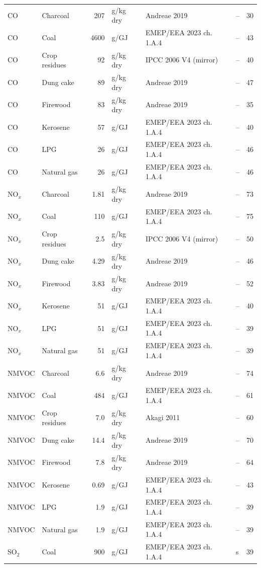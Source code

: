 \begin{table}[htbp]
\begin{tabular}{@{}llrlllr@{}}
CO & Charcoal & 207 & g/kg dry & Andreae 2019 & -- & 30 \\
CO & Coal & 4600 & g/GJ & EMEP/EEA 2023 ch.\,1.A.4 & -- & 43 \\
CO & Crop residues & 92 & g/kg dry & IPCC 2006 V4 (mirror) & -- & 40 \\
CO & Dung cake & 89 & g/kg dry & Andreae 2019 & -- & 47 \\
CO & Firewood & 83 & g/kg dry & Andreae 2019 & -- & 35 \\
CO & Kerosene & 57 & g/GJ & EMEP/EEA 2023 ch.\,1.A.4 & -- & 40 \\
CO & LPG & 26 & g/GJ & EMEP/EEA 2023 ch.\,1.A.4 & -- & 46 \\
CO & Natural gas & 26 & g/GJ & EMEP/EEA 2023 ch.\,1.A.4 & -- & 46 \\
NO$_x$ & Charcoal & 1.81 & g/kg dry & Andreae 2019 & -- & 73 \\
NO$_x$ & Coal & 110 & g/GJ & EMEP/EEA 2023 ch.\,1.A.4 & -- & 75 \\
NO$_x$ & Crop residues & 2.5 & g/kg dry & IPCC 2006 V4 (mirror) & -- & 50 \\
NO$_x$ & Dung cake & 4.29 & g/kg dry & Andreae 2019 & -- & 46 \\
NO$_x$ & Firewood & 3.83 & g/kg dry & Andreae 2019 & -- & 52 \\
NO$_x$ & Kerosene & 51 & g/GJ & EMEP/EEA 2023 ch.\,1.A.4 & -- & 40 \\
NO$_x$ & LPG & 51 & g/GJ & EMEP/EEA 2023 ch.\,1.A.4 & -- & 39 \\
NO$_x$ & Natural gas & 51 & g/GJ & EMEP/EEA 2023 ch.\,1.A.4 & -- & 39 \\
NMVOC & Charcoal & 6.6 & g/kg dry & Andreae 2019 & -- & 74 \\
NMVOC & Coal & 484 & g/GJ & EMEP/EEA 2023 ch.\,1.A.4 & -- & 61 \\
NMVOC & Crop residues & 7.0 & g/kg dry & Akagi 2011 & -- & 60 \\
NMVOC & Dung cake & 14.4 & g/kg dry & Andreae 2019 & -- & 70 \\
NMVOC & Firewood & 7.8 & g/kg dry & Andreae 2019 & -- & 64 \\
NMVOC & Kerosene & 0.69 & g/GJ & EMEP/EEA 2023 ch.\,1.A.4 & -- & 43 \\
NMVOC & LPG & 1.9 & g/GJ & EMEP/EEA 2023 ch.\,1.A.4 & -- & 39 \\
NMVOC & Natural gas & 1.9 & g/GJ & EMEP/EEA 2023 ch.\,1.A.4 & -- & 39 \\
SO$_2$ & Coal & 900 & g/GJ & EMEP/EEA 2023 ch.\,1.A.4 & s & 39 \\

\end{tabular}
\end{table}
